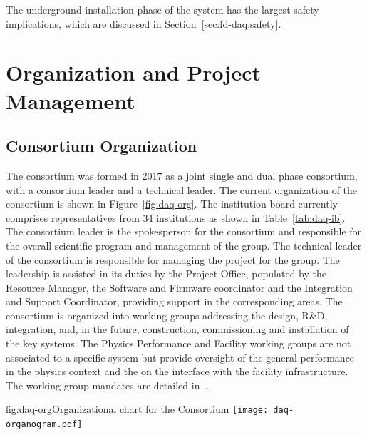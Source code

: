 The underground installation phase of the  system has the largest safety
implications, which are discussed in Section~\ref{sec:fd-daq:safety}.

\section{Organization and Project Management}
\label{sec:sp-daq:organization}


\subsection{Consortium Organization}

The  consortium was formed in 2017 as a joint single and
dual phase consortium, with a consortium leader and a technical
leader. The current organization of the consortium is shown in
Figure~\ref{fig:daq-org}. The  institution board currently comprises
representatives from 34 institutions as shown in Table~\ref{tab:daq-ib}. The consortium leader is the spokesperson for the consortium and responsible for the overall scientific program and management of the group. The technical leader of the consortium is responsible for
managing the project for the group. The leadership is assisted in its duties by the Project Office, populated by the Resource Manager, the Software and Firmware coordinator and the Integration and Support Coordinator, providing support in the corresponding areas. 
The consortium is organized into working groups addressing the design,
R\&D, integration, and, in the future, construction, commissioning and installation of the key  systems. The Physics Performance and Facility working groups are not associated to a specific system but provide oversight of the general  performance in the physics context and the on the interface with the facility infrastructure. The  working group mandates are detailed in~.

\begin{dunefigure}{fig:daq-org}{Organizational chart for the  Consortium
}
  \texttt{[image: daq-organogram.pdf]}
\end{dunefigure}

